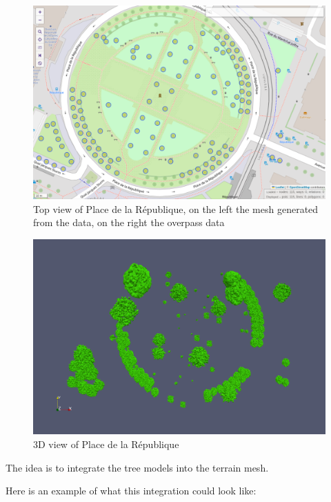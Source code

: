 \documentclass[12pt]{article}
\begin{document}
\begin{figure}[H]
        \centering
        \includegraphics[width=\textwidth]{images/republic_overpassturbo.png}
        \caption{Top view of Place de la République, on the left the mesh generated from the data,
        on the right the overpass data}
\end{figure}

\begin{figure}[H]
        \centering
        \includegraphics[width=\textwidth]{images/republic_lod3.png}
        \caption{3D view of Place de la République}
\end{figure}

The idea is to integrate the tree models into the terrain mesh.

Here is an example of what this integration could look like:
\end{document}
